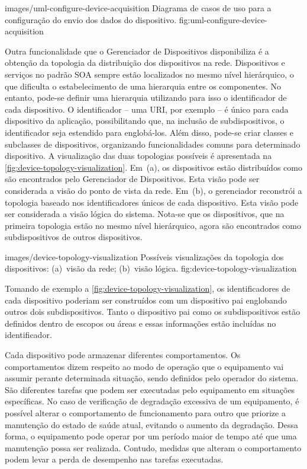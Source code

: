   {images/uml-configure-device-acquisition}
  {Diagrama de casos de uso para a configuração do envio dos dados do dispositivo.}
  {fig:uml-configure-device-acquisition}

Outra funcionalidade que o Gerenciador de Dispositivos disponibiliza é a obtenção da topologia da
distribuição dos dispositivos na rede. Dispositivos e serviços no padrão \gls{SOA} sempre estão
localizados no mesmo nível hierárquico, o que dificulta o estabelecimento de uma hierarquia entre os
componentes. No entanto, pode-se definir uma hierarquia utilizando para isso o identificador de cada
dispositivo. O identificador -- uma \gls{URI}, por exemplo -- é único para cada dispositivo da
aplicação, possibilitando que, na inclusão de subdispositivos, o identificador seja estendido para
englobá-los. Além disso, pode-se criar classes e subclasses de dispositivos, organizando
funcionalidades comuns para determinado dispositivo. A visualização das duas topologias possíveis é
apresentada na \cref{fig:device-topology-visualization}. Em~(a), os dispositivos estão distribuídos
como são encontrados pelo Gerenciador de Dispositivos. Esta visão pode ser considerada a visão do
ponto de vista da rede. Em~(b), o gerenciador reconstrói a topologia baseado nos identificadores
únicos de cada dispositivo. Esta visão pode ser considerada a visão lógica do sistema. Nota-se que
os dispositivos, que na primeira topologia estão no mesmo nível hierárquico, agora são encontrados
como subdispositivos de outros dispositivos.

  {images/device-topology-visualization}
  {Possíveis visualizações da topologia dos dispositivos: (a)~visão da rede; (b)~visão lógica.}
  {fig:device-topology-visualization}

Tomando de exemplo a \cref{fig:device-topology-visualization}, os identificadores de cada
dispositivo poderiam ser construídos com um dispositivo pai englobando outros dois subdispositivos.
Tanto o dispositivo pai como os subdispositivos estão definidos dentro de escopos ou áreas e essas
informações estão incluídas no identificador.


Cada dispositivo pode armazenar diferentes comportamentos. Os comportamentos dizem respeito ao modo
de operação que o equipamento vai assumir perante determinada situação, sendo definidos pelo
operador do sistema. São diferentes tarefas que podem ser executadas pelo equipamento em situações
específicas. No caso de verificação de degradação excessiva de um equipamento, é possível alterar o
comportamento de funcionamento para outro que priorize a manutenção do estado de saúde atual,
evitando o aumento da degradação. Dessa forma, o equipamento pode operar por um período maior de
tempo até que uma manutenção possa ser realizada. Contudo, medidas que alteram o comportamento podem
levar a perda de desempenho nas tarefas executadas.

